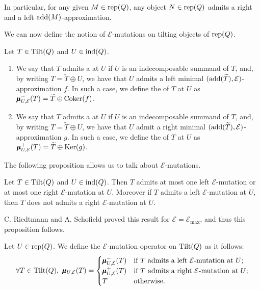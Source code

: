 \begin{remark}
\label{rem:addMcase}
    In particular, for any given $M \in \operatorname{rep}(Q)$, any object $N \in \operatorname{rep}(Q)$ admits a right and a left $\operatorname{add}(M)$-approximation.
\end{remark}

We can now define the notion of $\mathcal{E}$-mutations on tilting objects of $\operatorname{rep}(Q)$.

\begin{definition} \label{def:leftrightEmutation}
Let $T \in \operatorname{Tilt}(Q)$ and $U \in \operatorname{ind}(Q)$.
\begin{enumerate}[label=$\bullet$, itemsep=1mm]
    \item We say that $T$ admits a  at $U$ if $U$ is an indecomposable summand of $T$, and, by writing $T = \widetilde{T} \oplus U$, we have that $U$ admits a left minimal $(\operatorname{add}(\widetilde{T}),\mathcal{E})$-approximation $f$. In such a case, we define the  of $T$ at $U$ as $\pmb{\mu}_{U,\mathcal{E}}^{-}(T) = \widetilde{T} \oplus \operatorname{Coker}(f)$. 
    \item We say that $T$ admits a  at $U$ if $U$ is an indecomposable summand of $T$, and, by writing $T = \widetilde{T} \oplus U$, we have that $U$ admit a right minimal $(\operatorname{add}(\widetilde{T}),\mathcal{E})$-approximation $g$. In such a case, we define the  of $T$ at $U$ as $\pmb{\mu}_{U,\mathcal{E}}^{+}(T) = \widetilde{T} \oplus \operatorname{Ker}(g)$. 
\end{enumerate}
\end{definition}

The following proposition allows us to talk about $\mathcal{E}$-mutations.

\begin{prop} \label{prop:OneEmutation}
    Let $T \in \operatorname{Tilt}(Q)$ and $U \in \operatorname{ind}(Q)$. Then $T$ admits at most one left $\mathcal{E}$-mutation or at most one right $\mathcal{E}$-mutation at $U$. Moreover if $T$ admits a left $\mathcal{E}$-mutation at $U$, then $T$ does not admits a right $\mathcal{E}$-mutation at $U$.
\end{prop}

\begin{remark} \label{rem:RS}
C. Riedtmann and A. Schofield \cite{RS91} proved this result for $\mathcal{E} = \mathcal{E}_{\max}$, and thus this proposition follows. 
\end{remark}

\begin{definition} \label{def:Emut}
    Let $U \in \operatorname{rep}(Q)$. We define the $\mathcal{E}$-mutation operator on $\operatorname{Tilt}(Q)$ as it follows:
    \[\forall T \in \Tilt(Q),\ \pmb{\mu}_{U,\mathcal{E}}(T) = \begin{cases}
        \pmb{\mu}_{U,\mathcal{E}}^{-}(T) & \text{if } T \text{ admits a left } \mathcal{E}\text{-mutation at } U; \\
        \pmb{\mu}_{U,\mathcal{E}}^{+}(T) & \text{if } T \text{ admits a right } \mathcal{E}\text{-mutation at } U; \\
        T & \text{otherwise.}
    \end{cases}\]
\end{definition}


